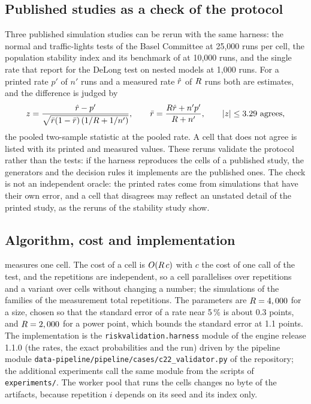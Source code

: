 \subsection{Published studies as a check of the protocol}
\label{sec:pm-published}

Three published simulation studies can be rerun with the same harness: the normal and traffic-lights tests of the Basel Committee at 25,000 runs per cell, the population stability index and its benchmark of \citet{yurdakul2020} at 10,000 runs, and the single rate that \citet{demler2012} report for the DeLong test on nested models at 1,000 runs.
For a printed rate $p'$ of $n'$ runs and a measured rate $\hat{r}$ of $R$ runs both are estimates, and the difference is judged by
\begin{equation}
z=\frac{\hat\rej-p'}{\sqrt{\bar\rej(1-\bar\rej)\,(1/\nrep+1/n')}},\qquad \bar\rej=\frac{\nrep\hat\rej+n'p'}{\nrep+n'},\qquad |z|\le3.29\ \text{agrees},
\label{eq:pooled-z}
\end{equation}
the pooled two-sample statistic at the pooled rate.
A cell that does not agree is listed with its printed and measured values.
These reruns validate the protocol rather than the tests: if the harness reproduces the cells of a published study, the generators and the decision rules it implements are the published ones. The check is not an independent oracle: the printed rates come from simulations that have their own error, and a cell that disagrees may reflect an unstated detail of the printed study, as the reruns of the stability study show.

\subsection{Algorithm, cost and implementation}
\label{sec:pm-algorithm}

 measures one cell.
The cost of a cell is $O(R\,c)$ with $c$ the cost of one call of the test, and the repetitions are independent, so a cell parallelises over repetitions and a variant over cells without changing a number; the \nSims{} simulations of the \nFamilies{} families of the measurement total \nReps{} repetitions.
The parameters are $R=4,000{}$ for a size, chosen so that the standard error of a rate near 5\,\% is about 0.3 points, and $R=2,000{}$ for a power point, which bounds the standard error at 1.1 points.
The implementation is the \texttt{riskvalidation.harness} module of the engine release 1.1.0 (the rates, the exact probabilities and the run) driven by the pipeline module \texttt{data-pipeline/pipeline/cases/c22\_validator.py} of the repository; the additional experiments call the same module from the scripts of \texttt{experiments/}. The worker pool that runs the cells changes no byte of the artifacts, because repetition $i$ depends on its seed and its index only.

